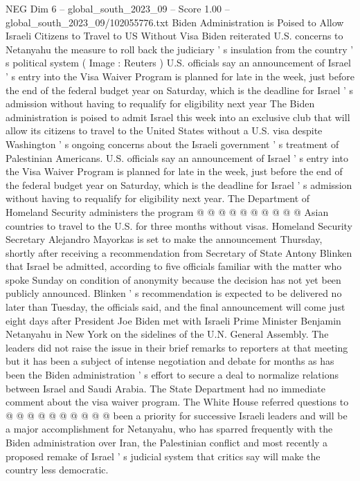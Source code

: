 \begin{textsample}{NEG Dim 6 – global\_south\_2023\_09 – Score 1.00 – global\_south\_2023\_09/102055776.txt}  \label{ex:f6_neg_074}
Biden Administration is Poised to Allow Israeli Citizens to Travel to US Without Visa Biden reiterated U.S. concerns to Netanyahu the measure to roll back the judiciary ' s insulation from the country ' s political system ( Image : Reuters ) U.S. officials say an announcement of Israel ' s entry into the Visa Waiver Program is planned for late in the week, just before the end of the federal budget year on Saturday, which is the deadline for Israel ' s admission without having to requalify for eligibility next year The Biden administration is poised to admit Israel this week into an exclusive club that will allow its citizens to travel to the United States without a U.S. visa despite Washington ' s ongoing concerns about the Israeli government ' s treatment of Palestinian Americans.
U.S. officials say an announcement of Israel ' s entry into the Visa Waiver Program is planned for late in the week, just before the end of the federal budget year on Saturday, which is the deadline for Israel ' s admission without having to requalify for eligibility next year.
The Department of Homeland Security administers the program @ @ @ @ @ @ @ @ @ @ Asian countries to travel to the U.S. for three months without visas.
Homeland Security Secretary Alejandro Mayorkas is set to make the announcement Thursday, shortly after receiving a recommendation from Secretary of State Antony Blinken that Israel be admitted, according to five officials familiar with the matter who spoke Sunday on condition of anonymity because the decision has not yet been publicly announced.
Blinken ' s recommendation is expected to be delivered no later than Tuesday, the officials said, and the final announcement will come just eight days after President Joe Biden met with Israeli Prime Minister Benjamin Netanyahu in New York on the sidelines of the U.N.
General Assembly.
The leaders did not raise the issue in their brief remarks to reporters at that meeting but it has been a subject of intense negotiation and debate for months as has been the Biden administration ' s effort to secure a deal to normalize relations between Israel and Saudi Arabia.
The State Department had no immediate comment about the visa waiver program.
The White House referred questions to @ @ @ @ @ @ @ @ @ @ been a priority for successive Israeli leaders and will be a major accomplishment for Netanyahu, who has sparred frequently with the Biden administration over Iran, the Palestinian conflict and most recently a proposed remake of Israel ' s judicial system that critics say will make the country less democratic.

\end{textsample}

